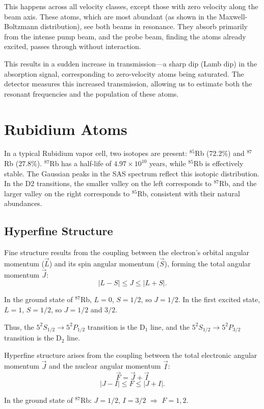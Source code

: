 \documentclass[a4paper, 12pt]{article}
\begin{document}
This happens across all velocity classes, except those with zero velocity along the beam axis. These atoms, which are most abundant (as shown in the Maxwell-Boltzmann distribution), see both beams in resonance. They absorb primarily from the intense pump beam, and the probe beam, finding the atoms already excited, passes through without interaction.

This results in a sudden increase in transmission—a sharp dip (Lamb dip) in the absorption signal, corresponding to zero-velocity atoms being saturated. The detector measures this increased transmission, allowing us to estimate both the resonant frequencies and the population of these atoms.

\section{Rubidium Atoms}
In a typical Rubidium vapor cell, two isotopes are present: $^{85}$Rb (72.2\%) and $^{87}$Rb (27.8\%). $^{87}$Rb has a half-life of $4.97 \times 10^{10}$ years, while $^{85}$Rb is effectively stable. The Gaussian peaks in the SAS spectrum reflect this isotopic distribution. In the D2 transitions, the smaller valley on the left corresponds to $^{87}$Rb, and the larger valley on the right corresponds to $^{85}$Rb, consistent with their natural abundances.

\subsection{Hyperfine Structure}
Fine structure results from the coupling between the electron’s orbital angular momentum ($\vec{L}$) and its spin angular momentum ($\vec{S}$), forming the total angular momentum $\vec{J}$:
\[
    |L - S| \leq J \leq |L + S|.
\]

In the ground state of $^{87}$Rb, $L = 0$, $S = 1/2$, so $J = 1/2$. In the first excited state, $L = 1$, $S = 1/2$, so $J = 1/2$ and $3/2$.

Thus, the $5^2S_{1/2} \rightarrow 5^2P_{1/2}$ transition is the D$_1$ line, and the $5^2S_{1/2} \rightarrow 5^2P_{3/2}$ transition is the D$_2$ line.

Hyperfine structure arises from the coupling between the total electronic angular momentum $\vec{J}$ and the nuclear angular momentum $\vec{I}$:
\[
    \vec{F} = \vec{J} + \vec{I}
\]
\[
    |J - I| \leq F \leq |J + I|.
\]

In the ground state of $^{87}$Rb: $J = 1/2$, $I = 3/2$ $\Rightarrow$ $F = 1, 2$.
\end{document}
